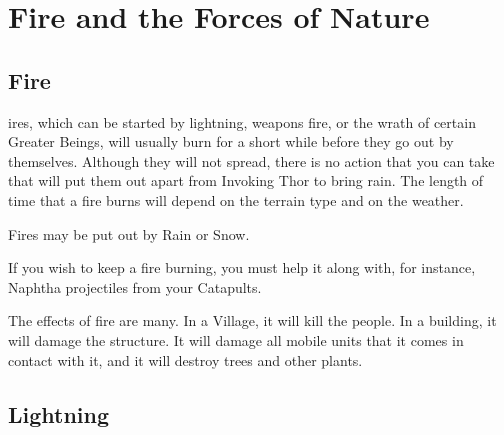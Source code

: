 
\chapter{Fire and the Forces of Nature}

\section{Fire}



ires, which can be started by lightning, weapons fire, or the wrath of certain Greater Beings, will usually burn for a short while before they go out by themselves. Although they will not spread, there is no action that you can take that will put them out apart from Invoking Thor to bring rain. The length of time that a fire burns will depend on the terrain type and on the weather.

Fires may be put out by Rain or Snow.


If you wish to keep a fire burning, you must help it along with, for instance, Naphtha projectiles from your Catapults.

The effects of fire are many. In a Village, it will kill the people. In a building, it will damage the structure. It will damage all mobile units that it comes in contact with it, and it will destroy trees and other plants.

\section{Lightning}


